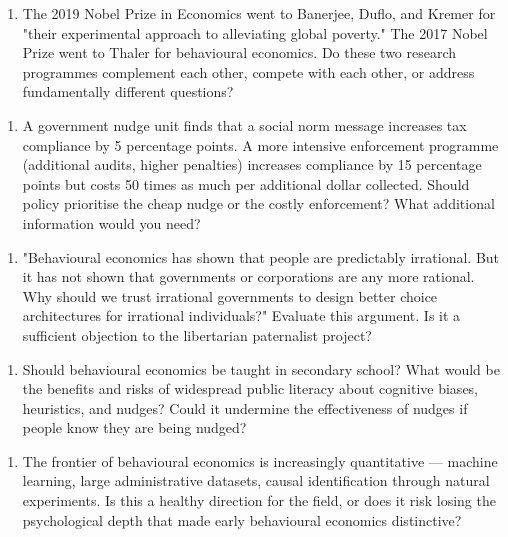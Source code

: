 \documentclass[12pt, letterpaper]{article}
\begin{document}
\begin{enumerate}
\item The 2019 Nobel Prize in Economics went to Banerjee, Duflo, and Kremer for "their experimental approach to alleviating global poverty." The 2017 Nobel Prize went to Thaler for behavioural economics. Do these two research programmes complement each other, compete with each other, or address fundamentally different questions?
\end{enumerate}

\begin{enumerate}
\item A government nudge unit finds that a social norm message increases tax compliance by 5 percentage points. A more intensive enforcement programme (additional audits, higher penalties) increases compliance by 15 percentage points but costs 50 times as much per additional dollar collected. Should policy prioritise the cheap nudge or the costly enforcement? What additional information would you need?
\end{enumerate}

\begin{enumerate}
\item "Behavioural economics has shown that people are predictably irrational. But it has not shown that governments or corporations are any more rational. Why should we trust irrational governments to design better choice architectures for irrational individuals?" Evaluate this argument. Is it a sufficient objection to the libertarian paternalist project?
\end{enumerate}

\begin{enumerate}
\item Should behavioural economics be taught in secondary school? What would be the benefits and risks of widespread public literacy about cognitive biases, heuristics, and nudges? Could it undermine the effectiveness of nudges if people know they are being nudged?
\end{enumerate}

\begin{enumerate}
\item The frontier of behavioural economics is increasingly quantitative --- machine learning, large administrative datasets, causal identification through natural experiments. Is this a healthy direction for the field, or does it risk losing the psychological depth that made early behavioural economics distinctive?
\end{enumerate}
\end{document}
